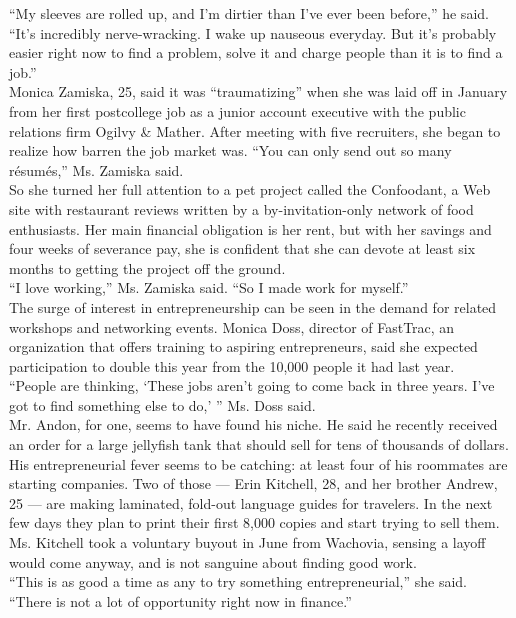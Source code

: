 \documentclass[spanish]{article}
\begin{document}
“My sleeves are rolled up, and I’m dirtier than I’ve ever been before,” he said. “It’s incredibly nerve-wracking. I wake up nauseous everyday. But it’s probably easier right now to find a problem, solve it and charge people than it is to find a job.”\\

Monica Zamiska, 25, said it was “traumatizing” when she was laid off in January from her first postcollege job as a junior account executive with the public relations firm Ogilvy \& Mather. After meeting with five recruiters, she began to realize how barren the job market was. “You can only send out so many résumés,” Ms. Zamiska said.\\

So she turned her full attention to a pet project called the Confoodant, a Web site with restaurant reviews written by a by-invitation-only network of food enthusiasts. Her main financial obligation is her rent, but with her savings and four weeks of severance pay, she is confident that she can devote at least six months to getting the project off the ground.\\

“I love working,” Ms. Zamiska said. “So I made work for myself.”\\

The surge of interest in entrepreneurship can be seen in the demand for related workshops and networking events. Monica Doss, director of FastTrac, an organization that offers training to aspiring entrepreneurs, said she expected participation to double this year from the 10,000 people it had last year.\\

“People are thinking, ‘These jobs aren’t going to come back in three years. I’ve got to find something else to do,’ ” Ms. Doss said.\\

Mr. Andon, for one, seems to have found his niche. He said he recently received an order for a large jellyfish tank that should sell for tens of thousands of dollars.\\

His entrepreneurial fever seems to be catching: at least four of his roommates are starting companies. Two of those — Erin Kitchell, 28, and her brother Andrew, 25 — are making laminated, fold-out language guides for travelers. In the next few days they plan to print their first 8,000 copies and start trying to sell them.\\

Ms. Kitchell took a voluntary buyout in June from Wachovia, sensing a layoff would come anyway, and is not sanguine about finding good work.\\

“This is as good a time as any to try something entrepreneurial,” she said. “There is not a lot of opportunity right now in finance.”\\
\end{document}
